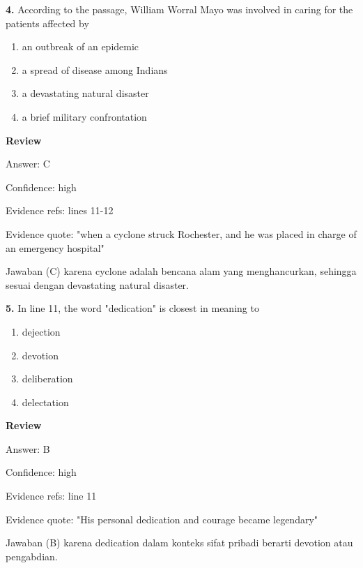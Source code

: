 \documentclass[12pt]{article}
\begin{document}
\endgroup
\par
\vspace{0.25\baselineskip}
\noindent\textbf{4.} According to the passage, William Worral Mayo was involved in caring for the patients affected by
\begin{enumerate}[label=(\Alph*),leftmargin=*,itemsep=0.2em]
\item an outbreak of an epidemic
\item a spread of disease among Indians
\item a devastating natural disaster
\item a brief military confrontation
\end{enumerate}
\par
\begingroup
\setlength{\parskip}{0pt}
\setlength{\parindent}{0pt}
\textbf{Review}\par
Answer: C\par
Confidence: high\par
Evidence refs: lines 11-12\par
Evidence quote: "when a cyclone struck Rochester, and he was placed in charge of an emergency hospital"\par
Jawaban (C) karena cyclone adalah bencana alam yang menghancurkan, sehingga sesuai dengan devastating natural disaster.\par
\endgroup
\par
\vspace{0.25\baselineskip}
\noindent\textbf{5.} In line 11, the word "dedication" is closest in meaning to
\begin{enumerate}[label=(\Alph*),leftmargin=*,itemsep=0.2em]
\item dejection
\item devotion
\item deliberation
\item delectation
\end{enumerate}
\par
\begingroup
\setlength{\parskip}{0pt}
\setlength{\parindent}{0pt}
\textbf{Review}\par
Answer: B\par
Confidence: high\par
Evidence refs: line 11\par
Evidence quote: "His personal dedication and courage became legendary"\par
Jawaban (B) karena dedication dalam konteks sifat pribadi berarti devotion atau pengabdian.\par
\endgroup
\par
\end{document}
